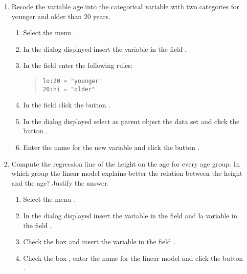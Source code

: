 \begin{enumerate}[leftmargin=*]
\begin{enumerate}
\item Recode the variable age into the categorical variable  with two categories for younger
and older than 20 years.
\begin{indication}
\begin{enumerate}
\item Select the menu .
\item In the dialog displayed insert the variable  in the field .
\item In the field  enter the following rules:
\begin{quote}
\lstinline{lo:20 = "younger"}\\
\lstinline{20:hi = "older"}
\end{quote}
\item In the field  click the button .
\item In the dialog displayed select as parent object the data set  and click the button
.
\item Enter the name  for the new variable and click the button .
\end{enumerate}
\end{indication}

\item Compute the regression line of the height on the age for every age group.
In which group the linear model explains better the relation between the height and the age? 
Justify the answer.
\begin{indication}
\begin{enumerate}
\item Select the menu .
\item In the dialog displayed insert the variable  in the field  and la
variable  in the field .
\item Check the box  and insert the variable  in the field
.
\item Check the box , enter the name  for the linear
model and click the button .
\end{enumerate}
\end{indication}


\end{enumerate}
\end{enumerate}
